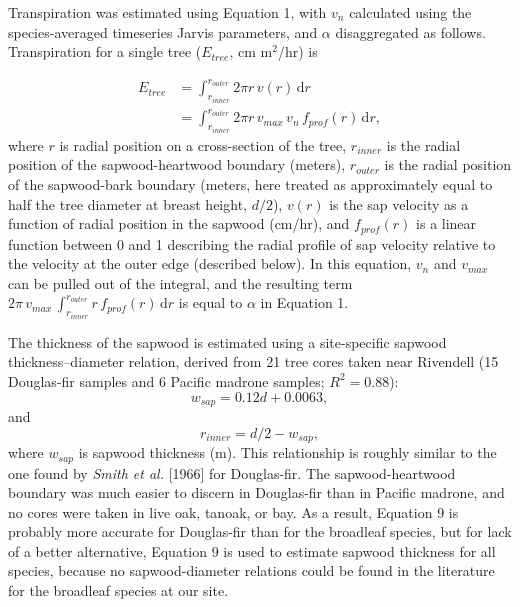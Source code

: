 Transpiration was estimated using Equation 1, with $v_n$ calculated using the species-averaged timeseries Jarvis parameters, and $\alpha$ disaggregated as follows.  Transpiration for a single tree ($E_{tree}$, cm m$^2$/hr) is

\begin{align}
E_{tree} & = \int_{r_{inner}}^{r_{outer}} 2\pi r \, v(r) \, \mathrm{d}r \nonumber \\ 
& =  \int_{r_{inner}}^{r_{outer}}  2\pi r \, v_{max} \, v_{n} \, f_{prof}(r) \, \mathrm{d}r,
\end{align}
where $r$ is radial position on a cross-section of the tree, $r_{inner}$ is the radial position of the sapwood-heartwood boundary (meters), $r_{outer}$ is the radial position of the sapwood-bark boundary (meters, here treated as approximately equal to half the tree diameter at breast height, $d/2$), $v(r)$ is the sap velocity as a function of radial position in the sapwood (cm/hr), and $f_{prof}(r)$ is a linear function between 0 and 1 describing the radial profile of sap velocity relative to the velocity at the outer edge (described below).  In this equation, $v_n$ and $v_{max}$ can be pulled out of the integral, and the resulting term $2\pi \, v_{max} \, \int_{r_{inner}}^{r_{outer}}  r \, f_{prof}(r) \, \mathrm{d}r$ is equal to $\alpha$ in Equation 1.

The thickness of the sapwood is estimated using a site-specific sapwood thickness--diameter relation, derived from 21 tree cores taken near Rivendell (15 Douglas-fir samples and 6 Pacific madrone samples; $R^2=0.88$):
\begin{equation}
w_{sap} = 0.12d+0.0063,
\end{equation}
and
\begin{equation}
r_{inner} = d/2-w_{sap},
\end{equation}
where $w_{sap}$ is sapwood thickness (m).  This relationship is roughly similar to the one found by \textit{Smith et al.} [1966] for Douglas-fir.  The sapwood-heartwood boundary was much easier to discern in Douglas-fir than in Pacific madrone, and no cores were taken in live oak, tanoak, or bay.  As a result, Equation 9 is probably more accurate for Douglas-fir than for the broadleaf species, but for lack of a better alternative, Equation 9 is used to estimate sapwood thickness for all species, because no sapwood-diameter relations could be found in the literature for the broadleaf species at our site.

